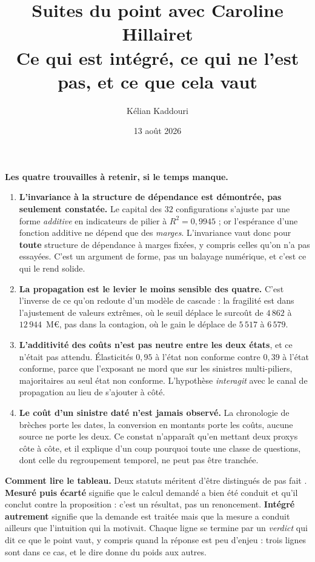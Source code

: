 \documentclass[11pt,a4paper]{article}
\title{\vspace{-1.3cm}\color{navy}\bfseries Suites du point avec Caroline Hillairet\\[2pt]
  \large Ce qui est intégré, ce qui ne l'est pas, et ce que cela vaut}
\author{Kélian Kaddouri}
\date{13 août 2026}
\begin{document}
\maketitle
\thispagestyle{fancy}
\vspace{-0.7cm}

\begin{phare}
\textbf{Les quatre trouvailles à retenir, si le temps manque.}
\begin{enumerate}[leftmargin=*,itemsep=2pt,topsep=3pt]
\item \textbf{L'invariance à la structure de dépendance est démontrée, pas seulement constatée.}
Le capital des $32$ configurations s'ajuste par une forme \emph{additive} en indicateurs de pilier
à $R^2 = 0{,}9945$ ; or l'espérance d'une fonction additive ne dépend que des \emph{marges}.
L'invariance vaut donc pour \textbf{toute} structure de dépendance à marges fixées, y compris
celles qu'on n'a pas essayées. C'est un argument de forme, pas un balayage numérique, et c'est ce
qui le rend solide.
\item \textbf{La propagation est le levier le moins sensible des quatre.} C'est l'inverse de ce
qu'on redoute d'un modèle de cascade : la fragilité est dans l'ajustement de valeurs extrêmes, où
le seuil déplace le surcoût de $4\,862$ à $12\,944$~M\euro, pas dans la contagion, où le gain le
déplace de $5\,517$ à $6\,579$.
\item \textbf{L'additivité des coûts n'est pas neutre entre les deux états}, et ce n'était pas
attendu. Élasticités $0{,}95$ à l'état non conforme contre $0{,}39$ à l'état conforme, parce que
l'exposant ne mord que sur les sinistres multi-piliers, majoritaires au seul état non conforme.
L'hypothèse \emph{interagit} avec le canal de propagation au lieu de s'ajouter à côté.
\item \textbf{Le coût d'un sinistre daté n'est jamais observé.} La chronologie de brèches porte
les dates, la conversion en montants porte les coûts, aucune source ne porte les deux. Ce constat
n'apparaît qu'en mettant deux proxys côte à côte, et il explique d'un coup pourquoi toute une
classe de questions, dont celle du regroupement temporel, ne peut pas être tranchée.
\end{enumerate}
\end{phare}

\vspace{0.2cm}
\begin{cle}
\textbf{Comment lire le tableau.} Deux statuts méritent d'être distingués de \og pas fait \fg.
\textbf{Mesuré puis écarté} signifie que le calcul demandé a bien été conduit et qu'il conclut
contre la proposition : c'est un résultat, pas un renoncement. \textbf{Intégré autrement}
signifie que la demande est traitée mais que la mesure a conduit ailleurs que l'intuition qui la
motivait. Chaque ligne se termine par un \emph{verdict} qui dit ce que le point vaut, y compris
quand la réponse est \og peu d'enjeu \fg : trois lignes sont dans ce cas, et le dire donne du
poids aux autres.
\end{cle}
\end{document}
